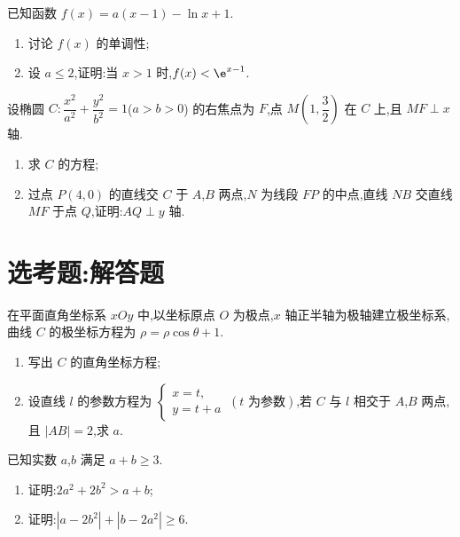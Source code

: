 \begin{problem}
已知函数 \(f(x)=a(x-1)-\ln x+1\).
\begin{enumerate}
\item 讨论 \(f(x)\) 的单调性;
\item 设 \(a\le2\),证明:当 \(x>1\) 时,\(f(x)<\e^{x-1}\).
\end{enumerate}
\end{problem}

\begin{problem}
设椭圆 \(C:\dfrac{x^2}{a^2}+\dfrac{y^2}{b^2}=1\)(\(a>b>0\)) 的右焦点为 \(F\),点 \(M\left(1,\dfrac32\right)\) 在 \(C\) 上,且 \(MF\perp x\) 轴.
\begin{enumerate}
\item 求 \(C\) 的方程;
\item 过点 \(P(4,0)\) 的直线交 \(C\) 于 \(A\),\(B\) 两点,\(N\) 为线段 \(FP\) 的中点,直线 \(NB\) 交直线 \(MF\) 于点 \(Q\),证明:\(AQ\perp y\) 轴.
\end{enumerate}
\end{problem}

\section{选考题:解答题}

\begin{problem}
在平面直角坐标系 \(xOy\) 中,以坐标原点 \(O\) 为极点,\(x\) 轴正半轴为极轴建立极坐标系,曲线 \(C\) 的极坐标方程为 \(\rho=\rho\cos\theta+1\).
\begin{enumerate}
\item 写出 \(C\) 的直角坐标方程;
\item 设直线 \(l\) 的参数方程为 \(\begin{cases}
x=t,\\
y=t+a
\end{cases}\ (t\text{ 为参数})\),若 \(C\) 与 \(l\) 相交于 \(A\),\(B\) 两点,且 \(|AB|=2\),求 \(a\).
\end{enumerate}
\end{problem}

\begin{problem}
已知实数 \(a\),\(b\) 满足 \(a+b\ge3\).
\begin{enumerate}
\item 证明:\(2a^2+2b^2>a+b\);
\item 证明:\(|a-2b^2|+|b-2a^2|\ge6\).
\end{enumerate}
\end{problem}

